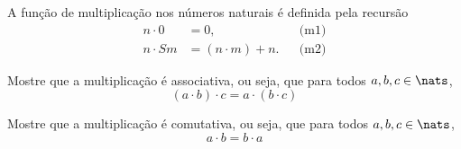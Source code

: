 \begin{definition}
	A função de multiplicação nos números naturais é definida pela recursão
	$$
		\begin{aligned}
			n \cdot 0 &= 0, && \text{(m1)}\\
			n \cdot Sm &= (n \cdot m) + n. && \text{(m2)}
		\end{aligned}
	$$
\end{definition}

\begin{exercise}
    Mostre que a multiplicação é associativa, ou seja, que para todos $a,b,c \in \nats$,
    $$
        (a \cdot b) \cdot c = a \cdot (b \cdot c)
    $$
\end{exercise}

\begin{exercise}
    Mostre que a multiplicação é comutativa, ou seja, que para todos $a,b,c \in \nats$,
    $$
        a \cdot b = b \cdot a
    $$
\end{exercise}
